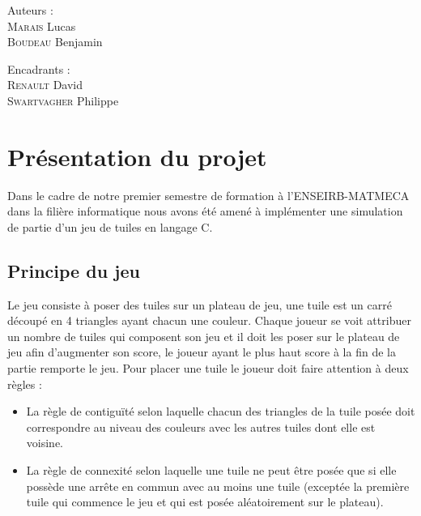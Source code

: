 \documentclass[11pt]{article}
\begin{document}
\begin{titlepage}
\begin{minipage}[b]{0.40\linewidth}
        \flushleft 
        \large
        Auteurs : 
        \\
        \textsc{Marais} Lucas
        \\
        \textsc{Boudeau} Benjamin
    \end{minipage} \hfill
    \begin{minipage}[b]{0.40\linewidth}
        \flushright 
        \large 
        Encadrants : 
        \\
        \textsc{Renault} David
        \\
        \textsc{Swartvagher} Philippe
    \end{minipage} \hfill

\end{titlepage}

\newpage




\tableofcontents
\newpage

\section{Présentation du projet}
Dans le cadre de notre premier semestre de formation à l'ENSEIRB-MATMECA dans la filière informatique nous avons été amené à implémenter une simulation de partie d'un jeu de tuiles en langage C. 

\subsection{Principe du jeu}
Le jeu consiste à poser des tuiles sur un plateau de jeu,  une tuile est un carré découpé en 4 triangles ayant chacun une couleur. Chaque joueur se voit attribuer un nombre de tuiles qui composent son jeu et il doit les poser sur le plateau de jeu afin d'augmenter son score, le joueur ayant le plus haut score à la fin de la partie remporte le jeu. Pour placer une tuile le joueur doit faire attention à deux règles : \\ 
\begin{itemize}
    \item La règle de contiguïté selon laquelle chacun des triangles de la tuile posée doit correspondre au niveau des couleurs avec les autres tuiles dont elle est voisine.
    \item La règle de connexité selon laquelle une tuile ne peut être posée que si elle possède une arrête en commun avec au moins une tuile (exceptée la première tuile qui commence le jeu et qui est posée aléatoirement sur le plateau). \\
\end{itemize}
\end{document}
